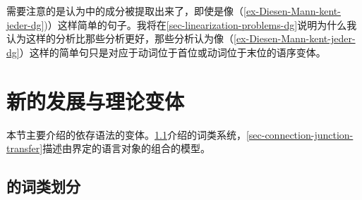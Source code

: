 需要注意的是\citet[]{Hudson97a}认为\vfc 中的成分被提取出来了，即使是像（\ref{ex-Diesen-Mann-kent-jeder-dg})）这样简单的句子。我将在\ref{sec-linearization-problems-dg}说明为什么我认为这样的分析比那些分析更好，那些分析认为像（\ref{ex-Diesen-Mann-kent-jeder-dg}）这样的简单句只是对应于动词位于首位或动词位于末位的语序变体。

\section{新的发展与理论变体}

本节主要介绍\tes 的依存语法的变体。\ref{sec-tesniere-pos}介绍\tes 的词类系统，\ref{sec-connection-junction-transfer}描述由\tes 界定的语言对象的组合的模型。

\subsection{\tes 的词类划分}
\label{sec-tesniere-pos}

